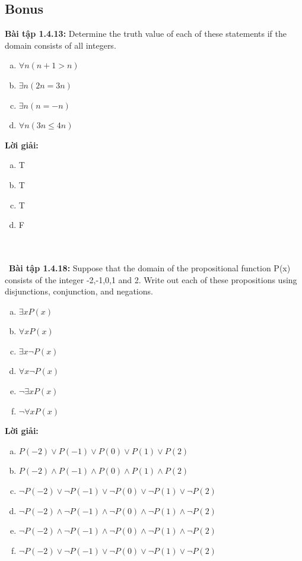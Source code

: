 \documentclass[a4paper]{article}
\begin{document}
\subsection{Bonus}
\textbf{Bài tập 1.4.13: } Determine the truth value of each of these statements if the domain consists of all integers.
\begin{enumerate}[a)]
\item $\forall n(n+1>n)$
\item $\exists n(2n=3n)$
\item $\exists n(n=-n)$
\item $\forall n(3n \leqslant 4n)$
\end{enumerate}
\textbf{Lời giải:} \begin{enumerate}[a)]
\item T
\item T
\item T
\item F
\end{enumerate} \\\ \\\
\textbf{Bài tập 1.4.18: } Suppose that the domain of the propositional function P(x) consists of the integer -2,-1,0,1 and 2. Write out each of these propositions using disjunctions, conjunction, and negations.
\begin{enumerate}[a)]
\item $\exists x P(x)$
\item $\forall x P(x)$
\item $\exists x \lnot P(x)$
\item $\forall x \lnot P(x)$
\item $\lnot \exists x P(x)$
\item $\lnot \forall x P(x)$
\end{enumerate}
\textbf{Lời giải:} \begin{enumerate}[a)]
\item $P(-2) \lor P(-1) \lor P(0) \lor P(1) \lor P(2)$
\item $P(-2) \land P(-1) \land P(0) \land P(1) \land P(2)$
\item $\lnot P(-2) \lor \lnot P(-1) \lor \lnot P(0) \lor \lnot P(1) \lor \lnot P(2)$
\item $\lnot P(-2) \land \lnot P(-1) \land \lnot P(0) \land \lnot P(1) \land \lnot P(2)$
\item $\lnot P(-2) \land \lnot P(-1) \land \lnot P(0) \land \lnot P(1) \land \lnot P(2)$
\item $\lnot P(-2) \lor \lnot P(-1) \lor \lnot P(0) \lor \lnot P(1) \lor \lnot P(2)$
\end{enumerate}
\end{document}
